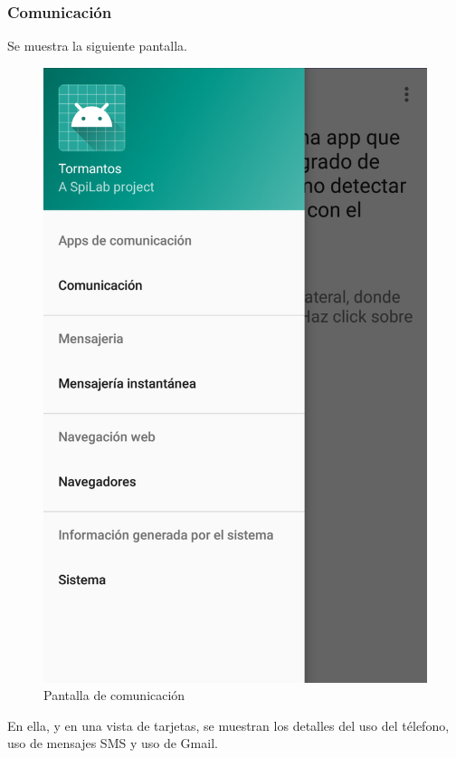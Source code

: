 \documentclass[12pt,a4paper,oneside]{book} %
\begin{document}
\subsubsection{Comunicación}
Se muestra la siguiente pantalla. 
\begin{figure}[H]
	\begin{center}
     	\includegraphics[scale=0.2]{pictures/capsapp/navigation.png}
	    	\caption{Pantalla de comunicación}
    	\label{fig:Pantalla de comunicacion}
	\end{center}
\end{figure}
En ella, y en una vista de tarjetas, se muestran los detalles del uso del télefono, uso de mensajes SMS y uso de Gmail. 
\end{document}

